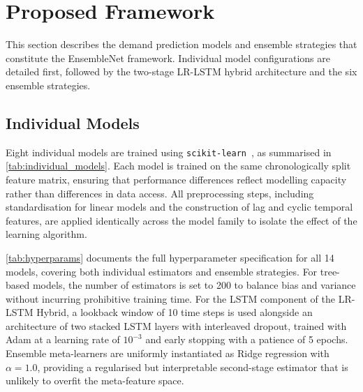 \documentclass[a4paper,fleqn]{cas-dc}
\begin{document}
\FloatBarrier

\section{Proposed Framework}
\label{sec:models}

This section describes the demand prediction models and ensemble strategies that constitute the EnsembleNet framework.  Individual model configurations are detailed first, followed by the two-stage LR-LSTM hybrid architecture and the six ensemble strategies.

\subsection{Individual Models}

Eight individual models are trained using \texttt{scikit-learn}~\cite{scikit-learn}, as summarised in \autoref{tab:individual_models}.  Each model is trained on the same chronologically split feature matrix, ensuring that performance differences reflect modelling capacity rather than differences in data access.  All preprocessing steps, including standardisation for linear models and the construction of lag and cyclic temporal features, are applied identically across the model family to isolate the effect of the learning algorithm.

\autoref{tab:hyperparams} documents the full hyperparameter specification for all 14 models, covering both individual estimators and ensemble strategies.  For tree-based models, the number of estimators is set to 200 to balance bias and variance without incurring prohibitive training time.  For the LSTM component of the LR-LSTM Hybrid, a lookback window of 10 time steps is used alongside an architecture of two stacked LSTM layers with interleaved dropout, trained with Adam at a learning rate of $10^{-3}$ and early stopping with a patience of 5 epochs.  Ensemble meta-learners are uniformly instantiated as Ridge regression with $\alpha{=}1.0$, providing a regularised but interpretable second-stage estimator that is unlikely to overfit the meta-feature space.
\end{document}
